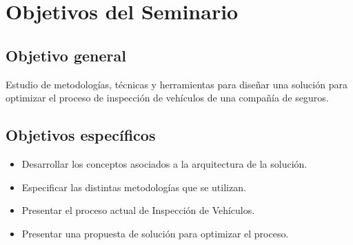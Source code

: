 \chapter*{Objetivos del Seminario}


\setlength{\parskip}{5mm}

\section{Objetivo general}

Estudio de metodologías, técnicas y herramientas para diseñar una solución para optimizar el proceso de inspección de vehículos de una compañía de seguros.

\section{Objetivos específicos}

\begin{itemize}

   \item Desarrollar los conceptos asociados a la arquitectura de la solución.

   \item Especificar las distintas metodologías que se utilizan.

   \item Presentar el proceso actual de Inspección de Vehículos.

   \item Presentar una propuesta de solución para optimizar el proceso.
	
	

\end{itemize}


\setlength{\parskip}{0mm}